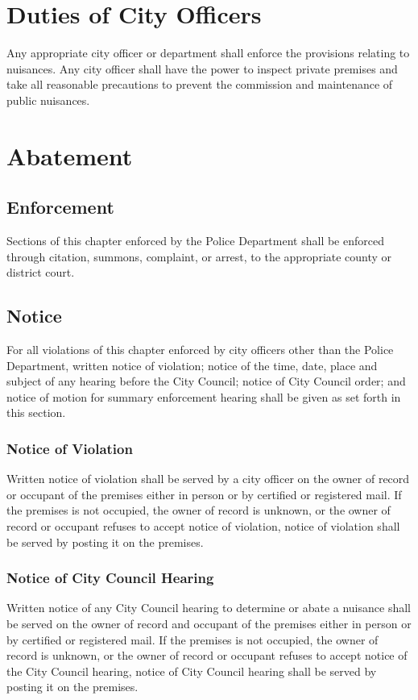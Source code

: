 \documentclass[code.tex]{subfiles}
\begin{document}
\section{Duties of City Officers}
Any appropriate city officer or department shall enforce the provisions relating to nuisances.  Any city officer shall have the power to inspect private premises and take all reasonable precautions to prevent the commission and maintenance of public nuisances.
\section{Abatement}
\subsection{Enforcement}
Sections of this chapter enforced by the Police Department shall be enforced through citation, summons, complaint, or arrest, to the appropriate county or district court.
\subsection{Notice}
For all violations of this chapter enforced by city officers other than the Police Department, written notice of violation; notice of the time, date, place and subject of any hearing before the City Council; notice of City Council order; and notice of motion for summary enforcement hearing shall be given as set forth in this section.
\subsubsection{Notice of Violation}
Written notice of violation shall be served by a city officer on the owner of record or occupant of the premises either in person or by certified or registered mail.  If the premises is not occupied, the owner of record is unknown, or the owner of record or occupant refuses to accept notice of violation, notice of violation shall be served by posting it on the premises.
\subsubsection{Notice of City Council Hearing}
Written notice of any City Council hearing to determine or abate a nuisance shall be served on the owner of record and occupant of the premises either in person or by certified or registered mail.  If the premises is not occupied, the owner of record is unknown, or the owner of record or occupant refuses to accept notice of the City Council hearing, notice of City Council hearing shall be served by posting it on the premises.
\end{document}
